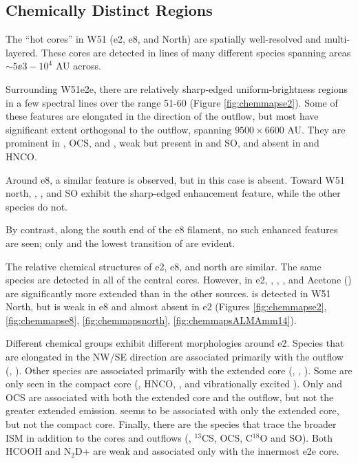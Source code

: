\documentclass{emulateapj}
\begin{document}

\subsection{Chemically Distinct Regions}
\label{sec:chemistrymaps}
\label{sec:chemistrymapsobs}
The ``hot cores'' in W51 (e2, e8, and North) are spatially well-resolved and
multi-layered.  These cores are detected in lines of many different species
spanning areas $\sim5\ee{3}-10^4$ AU across.

Surrounding W51e2e, there are relatively sharp-edged uniform-brightness regions
in a few spectral lines over the range 51-60 \kms (Figure
\ref{fig:chemmapse2}).  Some of these features are elongated in the direction
of the outflow, but most have significant extent orthogonal to the outflow,
spanning $9500\times6600$ AU.  They are prominent in \methanol, OCS, and
\dimethylether, weak but present in \formaldehyde and SO, and absent in
\cyanoacetylene and HNCO.

Around e8, a similar feature is observed, but in this case \dimethylether is absent.
Toward W51 north, \methanol, \formaldehyde, and SO exhibit the sharp-edged
enhancement feature, while the other species do not.

By contrast, along the south end of the e8 filament, no such enhanced features
are seen; only \formaldehyde and the lowest transition of \methanol are
evident.

The relative chemical structures of e2, e8, and north are  similar.
The same species are detected in all of the central cores.  However, in e2,
\dimethylether, \methylformate, \ethylcyanide, and Acetone (\acetone) are
significantly more extended than in the other sources.
\gaucheethanol is detected in W51 North, but is weak in e8 and almost absent
in e2 (Figures \ref{fig:chemmapse2}, \ref{fig:chemmapse8},
\ref{fig:chemmapsnorth}, \ref{fig:chemmapsALMAmm14}).

Different chemical groups exhibit different morphologies around e2.  Species that
are elongated in the NW/SE direction are associated primarily with the outflow
(\cyanoacetylene, \ethylcyanide).  Other species are associated primarily with
the extended core (\methylformate, \dimethylether, \acetone).  Some are only
seen in the compact core (\methyleneamidogen, HNCO, \formamide, and
vibrationally excited \cyanoacetylene).  Only \methanol and OCS are associated
with both the extended core and the outflow, but not the greater extended
emission.  \ketene seems to be associated with only the extended core, but not
the compact core. Finally, there are the species that trace the broader ISM in
addition to the cores and outflows (\formaldehyde, $^{13}$CS, OCS, C$^{18}$O
and SO).  Both HCOOH and N$_2$D+ are weak and associated only with the innermost
e2e core.
\end{document}
